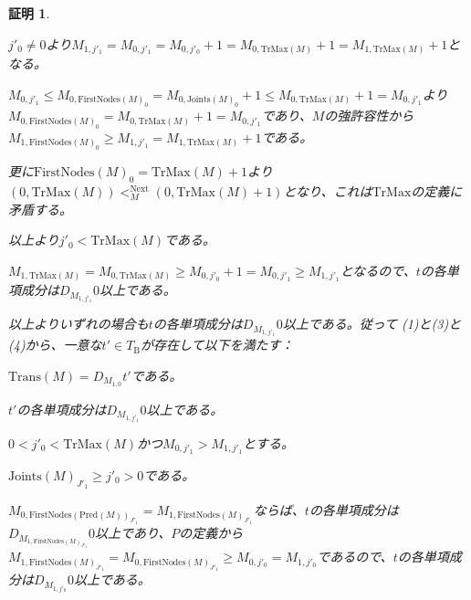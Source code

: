 \documentclass[dvipdfmx,uplatex]{jsarticle}
\theoremstyle{customnonumberbreakfortheorem}
\theoremstyle{customnonumberbreakforproof}
\newtheorem{hideableproof}{証明}
\begin{document}
\begin{hideableproof}
\begin{indented}
\begin{indented}
\begin{penumerate}
\begin{indented}
					\begin{indented}
						\item \(j'_0 \neq 0\)より\(M_{1,j'_1} = M_{0,j'_1} = M_{0,j'_0}+1 = M_{0,\textrm{TrMax}(M)}+1 = M_{1,\textrm{TrMax}(M)}+1\)となる。
						\item \(M_{0,j'_1} \leq M_{0,\textrm{FirstNodes}(M)_0} = M_{0,\textrm{Joints}(M)_0}+1 \leq M_{0,\textrm{TrMax}(M)}+1 = M_{0,j'_1}\)より\(M_{0,\textrm{FirstNodes}(M)_0} = M_{0,\textrm{TrMax}(M)}+1 = M_{0,j'_1}\)であり、\(M\)の強許容性から\(M_{1,\textrm{FirstNodes}(M)_0} \geq M_{1,j'_1} = M_{1,\textrm{TrMax}(M)}+1\)である。
						\item 更に\(\textrm{FirstNodes}(M)_0 = \textrm{TrMax}(M)+1\)より\((0,\textrm{TrMax}(M)) <_M^{\textrm{Next}} (0,\textrm{TrMax}(M)+1)\)となり、これは\(\textrm{TrMax}\)の定義に矛盾する。
					\end{indented}
					\item 以上より\(j'_0 < \textrm{TrMax}(M)\)である。
					\item \(M_{1,\textrm{TrMax}(M)} = M_{0,\textrm{TrMax}(M)} \geq M_{0,j'_0}+1 = M_{0,j'_1} \geq M_{1,j'_1}\)となるので、\(t\)の各単項成分は\(D_{M_{1,j'_1}} 0\)以上である。
				\end{indented}
				\item[] 以上よりいずれの場合も\(t\)の各単項成分は\(D_{M_{1,j'_1}} 0\)以上である。従って (1)と(3)と(4)から、一意な\(t' \in T_{\textrm{B}}\)が存在して以下を満たす：
				\begin{penumerate}
					\item \(\textrm{Trans}(M) = D_{M_{1,0}} t'\)である。
					\item \(t'\)の各単項成分は\(D_{M_{1,j'_1}} 0\)以上である。
				\end{penumerate}
			\end{penumerate}
			\item \(0 < j'_0 < \textrm{TrMax}(M)\)かつ\(M_{0,j'_1} > M_{1,j'_1}\)とする。
			\begin{penumerate}
				\item[] \(\textrm{Joints}(M)_{J'_1} \geq j'_0 > 0\)である。
				\setcounter{penumeratei}{1}
				\item \(M_{0,\textrm{FirstNodes}(\textrm{Pred}(M))_{J'_1}} = M_{1,\textrm{FirstNodes}(M)_{J'_1}}\)ならば、\(t\)の各単項成分は\(D_{M_{1,\textrm{FirstNodes}(M)_{J'_1}}} 0\)以上であり、\(P\)の定義から\(M_{1,\textrm{FirstNodes}(M)_{J'_1}} = M_{0,\textrm{FirstNodes}(M)_{J'_1}} \geq M_{0,j'_0} = M_{1,j'_0}\)であるので、\(t\)の各単項成分は\(D_{M_{1,j'_0}} 0\)以上である。

\end{penumerate}
\end{indented}
\end{indented}
\end{hideableproof}
\end{document}
